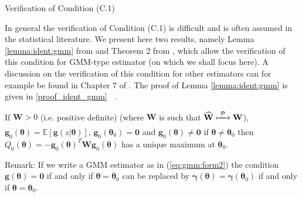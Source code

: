 \documentclass[envcountsect,usenames,dvipsnames]{beamer}
\def\btheta{\bm \theta}
\def\bgamma{\bm \gamma}
\def\g{\mathbf{g}}
\def\W{\mathbf{W}}
\theoremstyle{mystyle}
\begin{document}
\begin{frame}{Verification of Condition {\color{beamer@UIUCblue}(C.1)}}

\small

In general the verification of Condition {\color{beamer@UIUCblue}(C.1)} is difficult and is often assumed in the statistical literature. We present here two results, namely Lemma \ref{lemma:ident:gmm} from \cite{newey1994vlarge} and Theorem 2 from \cite{komunjer2012global}, which allow the verification of this condition for GMM-type estimator (on which we shall focus here). A discussion on the verification of this condition for other estimators can for example be found in Chapter 7 of \cite{baltagi2008companion}. The proof of Lemma \ref{lemma:ident:gmm} is given in \ref{proof_ident_gmm} $\;$     \hyperlink{proof_ident_gmm}{}.

	\begin{Lemma}
	\label{lemma:ident:gmm}
			If $\W > 0$ (i.e. positive definite) (where $\W$ is such that $\widehat{\W} \xmapsto[\;\;\;\;\; ]{\mathcal{P}} \W$), $\g_0 (\btheta) = \mathbb{E}[ \g(z | \btheta)]$, $\g_0 (\btheta_0) = \mathbf{0}$ and $\g_0 (\btheta) \neq \mathbf{0}$ if $\btheta \neq \btheta_0$ then $Q_0 (\btheta) = - \g_0 (\btheta)^T \W \g_0 (\btheta)$ has a unique maximum at $\btheta_0$.
	\end{Lemma}
	
	\begin{exampleblock}{Remark:}
		If we write a GMM estimator as in (\ref{eq:gmm:form2}) the condition $\g(\btheta) = \mathbf{0}$ if and only if $\btheta = \btheta_0$ can be replaced by $\bgamma (\btheta) = \bgamma (\btheta_0)$ if and only if $\btheta = \btheta_0$.
	\end{exampleblock}
\end{frame}
\end{document}
